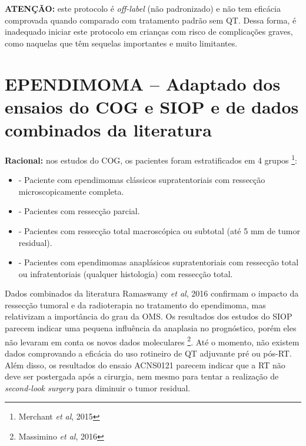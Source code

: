 \documentclass[11pt,a4paper,oldfontcommands]{memoir}
\begin{document}
\textbf{ATENÇÃO:} este protocolo é \textit{off-label} (não padronizado) e não tem eficácia comprovada quando comparado com tratamento padrão sem QT. Dessa forma, é inadequado iniciar este protocolo em crianças com risco de complicações graves, como naquelas que têm sequelas importantes e muito limitantes.
\cleardoublepage
\section{EPENDIMOMA  -- Adaptado dos ensaios do COG e SIOP e de dados combinados da literatura}
{\let\thefootnote\relax{}}
\small{
\textbf{Racional:} nos estudos do COG, os pacientes foram estratificados em 4 grupos \footnote{Merchant \textit{et al}, 2015}:
\begin{itemize}
\item[Estrato 1] - Paciente com ependimomas clássicos supratentoriais com ressecção microscopicamente completa.
\item[Estrato 2] - Pacientes com ressecção parcial.
\item[Estrato 3] - Pacientes com ressecção total macroscópica ou subtotal (até 5 mm de tumor residual).
\item[Estrato 4] - Pacientes com ependimomas anaplásicos supratentoriais com ressecção total ou infratentoriais (qualquer histologia) com ressecção total.
\end{itemize}

Dados combinados da literatura {Ramaswamy \textit{et al}, 2016} confirmam o impacto da ressecção tumoral e da radioterapia no tratamento do ependimoma, mas relativizam a importância do grau da OMS. Os resultados dos estudos do SIOP parecem indicar uma pequena influência da anaplasia no prognóstico, porém eles não levaram em conta os novos dados moleculares \footnote{Massimino  \textit{et al}, 2016}. Até o momento, não existem dados comprovando a eficácia do uso rotineiro de QT adjuvante pré ou pós-RT. Além disso, os resultados do ensaio ACNS0121 parecem indicar que a RT não deve ser postergada após a cirurgia, nem mesmo para tentar a realização de \textit{second-look surgery} para diminuir o tumor residual. 

}
\end{document}
